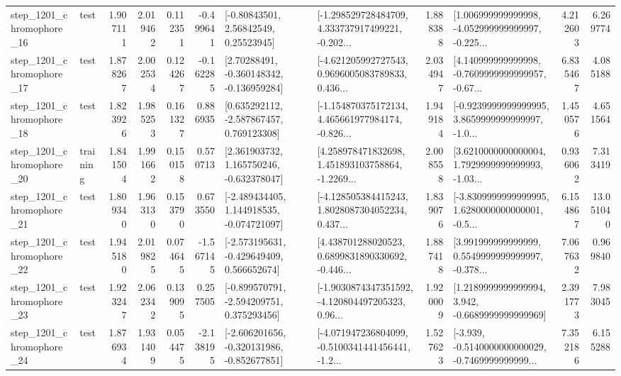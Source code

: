\begin{tabular}{llrrrrllrlrr}
 step\_1201\_chromophore\_16 &      test &      1.907111 &    2.019462 &      0.112351 & -0.499641 &       [-0.80843501, 2.56842549, 0.25523945] &  [-1.298529728484709, 4.333737917499221, -0.202... &       1.888388 &  [1.006999999999998, -4.052999999999997, -0.225... &            4.212603 &          6.269774 \\
 step\_1201\_chromophore\_17 &      test &      1.878267 &    2.002534 &      0.124267 & -0.162285 &    [2.70288491, -0.360148342, -0.136959284] &  [-4.621205992727543, 0.9696005083789833, 0.436... &       2.034947 &  [4.140999999999998, -0.7609999999999957, -0.67... &            6.835467 &          4.085188 \\
 step\_1201\_chromophore\_18 &      test &      1.823926 &    1.985253 &      0.161327 &  0.886935 &    [0.635292112, -2.587867457, 0.769123308] &  [-1.154870375172134, 4.465661977984174, -0.826... &       1.949184 &  [-0.9239999999999995, 3.8659999999999997, -1.0... &            1.450576 &          4.651564 \\
 step\_1201\_chromophore\_20 &  training &      1.841504 &    1.991662 &      0.150158 &  0.570713 &    [2.361903732, 1.165750246, -0.632378047] &  [4.258978471832698, 1.451893103758864, -1.2269... &       2.008558 &  [3.6210000000000004, 1.7929999999999993, -1.03... &            0.936062 &          7.313419 \\
 step\_1201\_chromophore\_21 &      test &      1.809340 &    1.963130 &      0.153790 &  0.673550 &   [-2.489434405, 1.144918535, -0.074721097] &  [-4.128505384415243, 1.8028087304052234, 0.437... &       1.839076 &  [-3.8309999999999995, 1.6280000000000001, -0.5... &            6.154867 &         13.051040 \\
 step\_1201\_chromophore\_22 &      test &      1.945180 &    2.019825 &      0.074645 & -1.567145 &   [-2.573195631, -0.429649409, 0.566652674] &  [4.438701288020523, 0.6899831890330692, -0.446... &       1.887418 &  [3.991999999999999, 0.5549999999999997, -0.378... &            7.067632 &          0.969840 \\
 step\_1201\_chromophore\_23 &      test &      1.923247 &    2.062342 &      0.139095 &  0.257505 &   [-0.899570791, -2.594209751, 0.375293456] &  [-1.9030874347351592, -4.120804497205323, 0.96... &       1.920009 &   [1.2189999999999994, 3.942, -0.6689999999999969] &            2.391773 &          7.983045 \\
 step\_1201\_chromophore\_24 &      test &      1.876934 &    1.931409 &      0.054475 & -2.138195 &  [-2.606201656, -0.320131986, -0.852677851] &  [-4.071947236804099, -0.5100341441456441, -1.2... &       1.527623 &  [-3.939, -0.5140000000000029, -0.7469999999999... &            7.352186 &          6.155288 \\

\end{tabular}
